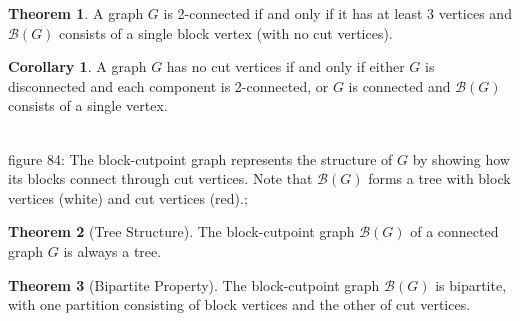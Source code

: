 \documentclass{article}
\theoremstyle{definition}
\newtheorem{theorem}{Theorem}
\newtheorem{corollary}{Corollary}
\begin{document}
\begin{theorem}
A graph $G$ is 2-connected if and only if it has at least 3 vertices and $\mathcal{B}(G)$ consists of a single block vertex (with no cut vertices).
\end{theorem}

\begin{corollary}
A graph $G$ has no cut vertices if and only if either $G$ is disconnected and each component is 2-connected, or $G$ is connected and $\mathcal{B}(G)$ consists of a single vertex.
\end{corollary}

\begin{center}
\\
\small figure 84: {The block-cutpoint graph represents the structure of $G$ by showing how its blocks connect through cut vertices. Note that $\mathcal{B}(G)$ forms a tree with block vertices (white) and cut vertices (red).};
\end{center}


\begin{theorem}[Tree Structure]
The block-cutpoint graph $\mathcal{B}(G)$ of a connected graph $G$ is always a tree.
\end{theorem}

\begin{theorem}[Bipartite Property]
The block-cutpoint graph $\mathcal{B}(G)$ is bipartite, with one partition consisting of block vertices and the other of cut vertices.
\end{theorem}
\end{document}
